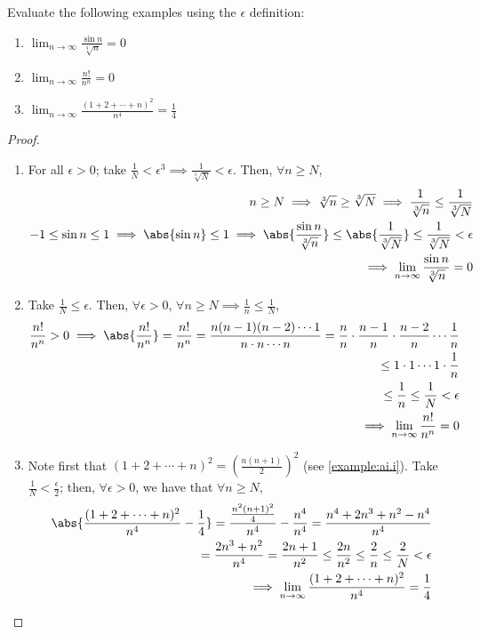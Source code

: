 \documentclass[12pt]{article}
\begin{document}
\begin{example}
  Evaluate the following examples using the $\epsilon$ definition:
  \begin{enumerate}
    \item $\lim_{n\to\infty} \frac{\sin n}{\sqrt[3]{n}} = 0$
    \item $\lim_{n\to\infty} \frac{n!}{n^n} = 0$
    \item $\lim_{n\to\infty} \frac{(1+2+\cdots + n)^2}{n^4} = \frac{1}{4}$
  \end{enumerate}


\begin{proof}
  \begin{enumerate}
    \item For all $\epsilon > 0$; take $\frac{1}{N} < \epsilon^3 \implies \frac{1}{\sqrt[3]{N}} < \epsilon$. Then, $\forall n \geq N$, \begin{align*}
      n \geq N \implies \sqrt[3]{n} \geq \sqrt[3]{N} \implies \frac{1}{\sqrt[3]{n}} \leq \frac{1}{\sqrt[3]{N}}\\
      -1 \leq \sin n \leq 1 \implies \abs{\sin n} \leq 1 \implies \abs{\frac{\sin n}{\sqrt[3]{n}}} \leq \abs{\frac{1}{\sqrt[3]{N}}} \leq \frac{1}{\sqrt[3]{N}} < \epsilon\\
      \implies \lim_{n\to\infty} \frac{\sin n}{\sqrt[3]{n}} = 0
    \end{align*}
    \item Take $\frac{1}{N} \leq \epsilon$. Then, $\forall \epsilon > 0$, $\forall n \geq N \implies \frac{1}{n} \leq \frac{1}{N}$, \begin{align*}
      \frac{n!}{n^n} > 0 \implies \abs{\frac{n!}{n^n}} = \frac{n!}{n^n} = \frac{n(n-1)(n-2)\cdots 1}{n\cdot n \cdots n} = \frac{n}{n} \cdot \frac{n-1}{n} \cdot \frac{n-2}{n} \cdots \frac{1}{n}\\
      \leq 1 \cdot 1 \cdots 1 \cdot \frac{1}{n}\\
      \leq \frac{1}{n} \leq \frac{1}{N} < \epsilon\\
      \implies \lim_{n\to\infty} \frac{n!}{n^n} = 0
    \end{align*}
    \item Note first that $(1+2+ \cdots + n)^2 = (\frac{n(n+1)}{2})^2$ (see \cref{example:ai.i}). Take $\frac{1}{N} < \frac{\epsilon}{2}$; then, $\forall \epsilon > 0$, we have that $\forall n \geq N$, \begin{align*}
      \abs{\frac{(1+2+\cdots + n)^2}{n^4} - \frac{1}{4}} = \frac{\frac{n^2(n+1)^2}{4}}{n^4} - \frac{n^4}{n^4} = \frac{n^4+2n^3+n^2 - n^4}{n^4}\\
      = \frac{2n^3 + n^2}{n^4} = \frac{2n+1}{n^2} \leq \frac{2n}{n^2} \leq \frac{2}{n} \leq \frac{2}{N} < \epsilon\\
      \implies \lim_{n\to\infty} \frac{(1+2+\cdots + n)^2}{n^4} = \frac{1}{4}
    \end{align*}
  \end{enumerate}
\end{proof}
\end{example}
\end{document}
